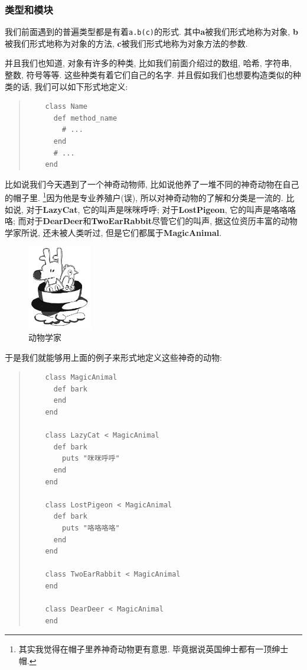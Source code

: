 \subsubsection*{类型和模块}
我们前面遇到的普遍类型都是有着\texttt{a.b(c)}的形式. 其中\textbf{a}被我们形式地称为对象, \textbf{b}被我们形式地称为对象的方法, \textbf{c}被我们形式地称为对象方法的参数. 

并且我们也知道, 对象有许多的种类, 比如我们前面介绍过的数组, 哈希, 字符串, 整数, 符号等等. 这些种类有着它们自己的名字. 并且假如我们也想要构造类似的种类的话, 我们可以如下形式地定义: 

\begin{quotation}
  \begin{verbatim}
    class Name
      def method_name
        # ...
      end
      # ...
    end
  \end{verbatim}
\end{quotation}

比如说我们今天遇到了一个神奇动物师, 比如说他养了一堆不同的神奇动物在自己的帽子里. \footnote{其实我觉得在帽子里养神奇动物更有意思. 毕竟据说英国绅士都有一顶绅士帽. }因为他是专业养殖户(误), 所以对神奇动物的了解和分类是一流的. 比如说, 对于\textbf{LazyCat}, 它的叫声是咪咪呼呼; 对于\textbf{LostPigeon}, 它的叫声是咯咯咯咯; 而对于\textbf{DearDeer}和\textbf{TwoEarRabbit}尽管它们的叫声, 据这位资历丰富的动物学家所说, 还未被人类听过, 但是它们都属于\textbf{MagicAnimal}. 

\begin{figure}[h]
  \centering
  \includegraphics[width=0.25\textwidth]{image/chapter/1_language/class_of_animal.jpg}
  \caption{动物学家}
\end{figure}

于是我们就能够用上面的例子来形式地定义这些神奇的动物: 

\begin{quotation}
  \begin{verbatim}
    class MagicAnimal
      def bark
      end
    end

    class LazyCat < MagicAnimal
      def bark
        puts "咪咪呼呼"
      end
    end
    
    class LostPigeon < MagicAnimal
      def bark
        puts "咯咯咯咯"
      end
    end

    class TwoEarRabbit < MagicAnimal
    end
    
    class DearDeer < MagicAnimal
    end
  \end{verbatim}
\end{quotation}


